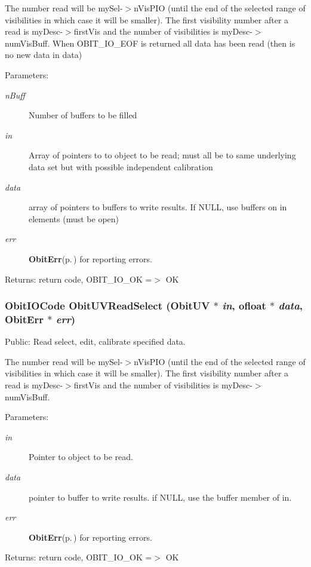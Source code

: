 The number read will be my\-Sel-$>$n\-Vis\-PIO (until the end of the selected range of visibilities in which case it will be smaller). The first visibility number after a read is my\-Desc-$>$first\-Vis and the number of visibilities is my\-Desc-$>$num\-Vis\-Buff. When OBIT\_\-IO\_\-EOF is returned all data has been read (then is no new data in data) \begin{Desc}
\item[Parameters:]
\begin{description}
\item[{\em n\-Buff}]Number of buffers to be filled \item[{\em in}]Array of pointers to to object to be read; must all be to same underlying data set but with possible independent calibration \item[{\em data}]array of pointers to buffers to write results. If NULL, use buffers on in elements (must be open) \item[{\em err}]{\bf Obit\-Err}{\rm (p.\,\pageref{structObitErr})} for reporting errors. \end{description}
\end{Desc}
\begin{Desc}
\item[Returns:]return code, OBIT\_\-IO\_\-OK =$>$ OK \end{Desc}
\subsubsection{\setlength{\rightskip}{0pt plus 5cm}Obit\-IOCode Obit\-UVRead\-Select ({\bf Obit\-UV} $\ast$ {\em in}, {\bf ofloat} $\ast$ {\em data}, {\bf Obit\-Err} $\ast$ {\em err})}\label{ObitUV_8h_a40}


Public: Read select, edit, calibrate specified data. 

The number read will be my\-Sel-$>$n\-Vis\-PIO (until the end of the selected range of visibilities in which case it will be smaller). The first visibility number after a read is my\-Desc-$>$first\-Vis and the number of visibilities is my\-Desc-$>$num\-Vis\-Buff. \begin{Desc}
\item[Parameters:]
\begin{description}
\item[{\em in}]Pointer to object to be read. \item[{\em data}]pointer to buffer to write results. if NULL, use the buffer member of in. \item[{\em err}]{\bf Obit\-Err}{\rm (p.\,\pageref{structObitErr})} for reporting errors. \end{description}
\end{Desc}
\begin{Desc}
\item[Returns:]return code, OBIT\_\-IO\_\-OK =$>$ OK \end{Desc}
